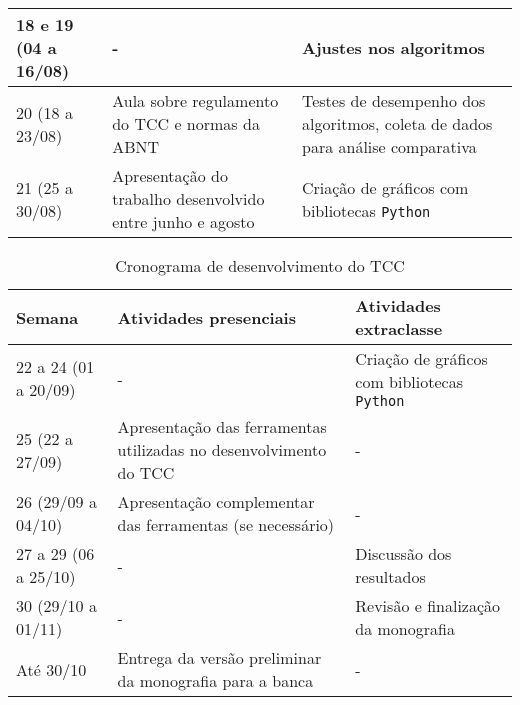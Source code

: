 \begin{table}[htb]
\begin{tabular}{|p{4cm}|p{5cm}|p{5cm}|}
        \hline
        18 e 19 (04 a 16/08) & - & Ajustes nos algoritmos \\
        \hline
        20 (18 a 23/08) & Aula sobre regulamento do TCC e normas da ABNT & Testes de desempenho dos algoritmos, coleta de dados para análise comparativa\\
        \hline
        21 (25 a 30/08) & Apresentação do trabalho desenvolvido entre junho e agosto & Criação de gráficos com bibliotecas \texttt{Python} \\
        \hline
    \end{tabular}
    \label{tab:cronograma}
\end{table}

\begin{table}[htb]
    \centering
    \renewcommand{\arraystretch}{1.3}
    \begin{tabular}{|p{4cm}|p{5cm}|p{5cm}|}
	\hline
        \textbf{Semana} & \textbf{Atividades presenciais} & \textbf{Atividades extraclasse} \\
        \hline
        22 a 24 (01 a 20/09) & - & Criação de gráficos com bibliotecas \texttt{Python} \\
        \hline
        25 (22 a 27/09) & Apresentação das ferramentas utilizadas no desenvolvimento do TCC & - \\
        \hline
        26 (29/09 a 04/10) & Apresentação complementar das ferramentas (se necessário) & - \\
        \hline
        27 a 29 (06 a 25/10) & - & Discussão dos resultados \\
        \hline
        30 (29/10 a 01/11) & - & Revisão e finalização da monografia \\
        \hline
        Até 30/10 & Entrega da versão preliminar da monografia para a banca & - \\
        \hline
    \end{tabular}
    \caption{Cronograma de desenvolvimento do TCC}
\end{table}
